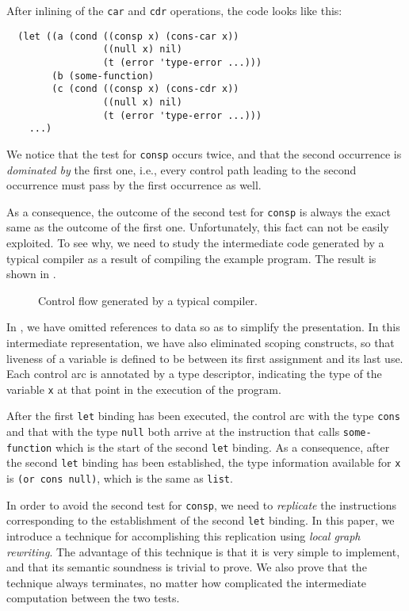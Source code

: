 After inlining of the \texttt{car} and \texttt{cdr} operations, the
code looks like this:

\begin{verbatim}
  (let ((a (cond ((consp x) (cons-car x))
                 ((null x) nil)
                 (t (error 'type-error ...)))
        (b (some-function)
        (c (cond ((consp x) (cons-cdr x))
                 ((null x) nil)
                 (t (error 'type-error ...)))
    ...)
\end{verbatim}

We notice that the test for \texttt{consp} occurs twice, and that the
second occurrence is \emph{dominated by} the first one, i.e., every
control path leading to the second occurrence must pass by the first
occurrence as well.

As a consequence, the outcome of the second test for \texttt{consp} is
always the exact same as the outcome of the first one.
Unfortunately, this fact can not be easily exploited.  To see why, we
need to study the intermediate code generated by a typical compiler as
a result of compiling the example program.  The result is shown in
.

\begin{figure}
\begin{center}
\end{center}
\caption{\label{fig-example-naive}
Control flow generated by a typical compiler.}
\end{figure}

In , we have omitted references to data so
as to simplify the presentation.  In this intermediate representation,
we have also eliminated scoping constructs, so that liveness of a
variable is defined to be between its first assignment and its last
use.  Each control arc is annotated by a type descriptor, indicating
the type of the variable \texttt{x} at that point in the execution of
the program.

After the first \texttt{let} binding has been executed, the control
arc with the type \texttt{cons} and that with the type \texttt{null}
both arrive at the instruction that calls \texttt{some-function} which
is the start of the second \texttt{let} binding.  As a consequence,
after the second \texttt{let} binding has been established, the type
information available for \texttt{x} is \texttt{(or cons null)}, which
is the same as \texttt{list}.

In order to avoid the second test for \texttt{consp}, we need to
\emph{replicate} the instructions corresponding to the establishment
of the second \texttt{let} binding.  In this paper, we introduce a
technique for accomplishing this replication using \emph{local graph
  rewriting}.  The advantage of this technique is that it is very
simple to implement, and that its semantic soundness is trivial to
prove.  We also prove that the technique always terminates, no matter
how complicated the intermediate computation between the two tests.
